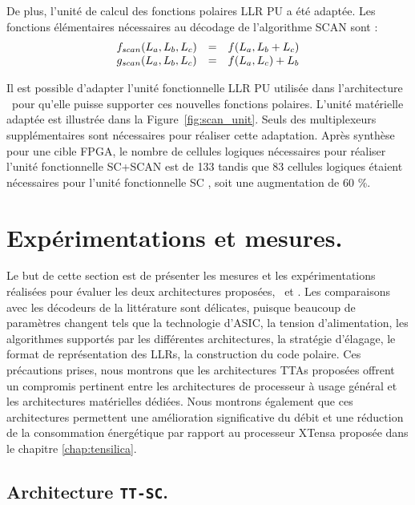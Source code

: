 De plus, l'unité de calcul des fonctions polaires LLR PU a été adaptée. Les fonctions élémentaires nécessaires au décodage de l'algorithme SCAN sont : 
\begin{eqnarray}
  \begin{array}{l c l}
    f_{scan}(L_a,L_b,L_c) & = & f(L_a, L_b  + L_c) \\
    g_{scan}(L_a,L_b,L_c) & = & f(L_a, L_c) + L_b
  \end{array}
  \label{eq:bp}
\end{eqnarray}


Il est possible d'adapter l'unité fonctionnelle LLR PU utilisée dans l'architecture \TTSC~pour qu'elle puisse supporter ces nouvelles fonctions polaires. L'unité matérielle adaptée est illustrée dans la Figure~\ref{fig:scan_unit}. Seuls des multiplexeurs supplémentaires sont nécessaires pour réaliser cette adaptation. Après synthèse pour une cible FPGA, le nombre de cellules logiques nécessaires pour réaliser l'unité fonctionnelle \og SC+SCAN \fg est de 133 tandis que 83 cellules logiques étaient nécessaires pour l'unité fonctionnelle \og SC \fg, soit une augmentation de 60 \%.



\section{Expérimentations et mesures.}
Le but de cette section est de présenter les mesures et les expérimentations réalisées pour évaluer les deux architectures proposées, \TTSC~et \TTSCAN. Les comparaisons avec les décodeurs de la littérature sont délicates, puisque beaucoup de paramètres changent tels que la technologie d'ASIC, la tension d'alimentation, les algorithmes supportés par les différentes architectures, la stratégie d'élagage, le format de représentation des LLRs, la construction du code polaire. Ces précautions prises, nous montrons que les architectures TTAs proposées offrent un compromis pertinent entre les architectures de processeur à usage général et les architectures matérielles dédiées. Nous montrons également que ces architectures permettent une amélioration significative du débit et une réduction de la consommation énergétique par rapport au processeur XTensa proposée dans le chapitre \ref{chap:tensilica}.

\subsection{Architecture \texttt{TT-SC}.}
\label{sec:tta_res}

